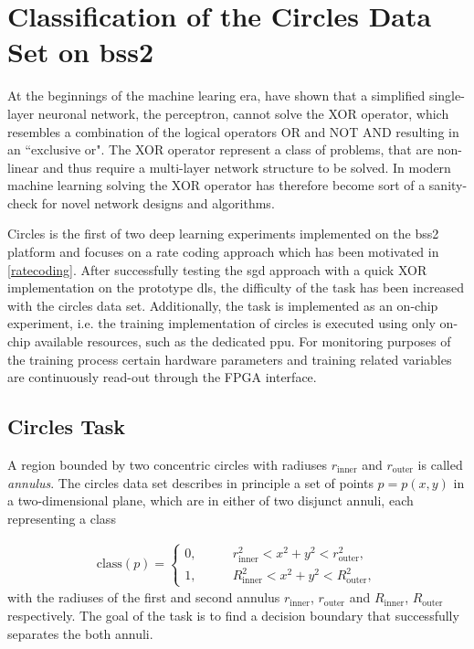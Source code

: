 \chapter{Classification of the Circles Data Set on \acrshort{bss2}}
\label{circles}
At the beginnings of the machine learing era, \cite{perceptron} have shown that a simplified single-layer neuronal network, the perceptron, cannot solve the XOR operator, which resembles a combination of the logical operators OR and NOT AND resulting in an ``exclusive or". The XOR operator represent a class of problems, that are non-linear and thus require a multi-layer network structure to be solved. In modern machine learning solving the XOR operator has therefore become sort of a sanity-check for novel network designs and algorithms.

Circles is the first of two deep learning experiments implemented on the \gls{bss2} platform and focuses on a rate coding approach which has been motivated in \cref{ratecoding}. After successfully testing the \acrlong{sgd} approach with a quick XOR implementation on the prototype \gls{dls}, the difficulty of the task has been increased with the circles data set. Additionally, the task is implemented as an on-chip experiment, i.e. the training implementation of circles is executed using only on-chip available resources, such as the dedicated \acrlong{ppu}. For monitoring purposes of the training process certain hardware parameters and training related variables are continuously read-out through the FPGA interface.





\section{Circles Task}
\label{circlestask}
A region bounded by two concentric circles with radiuses $r_{\text{inner}}$ and $r_{\text{outer}}$ is called \emph{annulus}. The circles data set describes in principle a set of points $p = p(x,y)$ in a two-dimensional plane, which are in either of two disjunct annuli, each representing a class 

\begin{align}
\text{class}(p) =
\begin{cases}
0 ,&\quad \quad r_{\text{inner}}^2 < x^2 + y^2 < r_{\text{outer}}^2, \\
1 ,&\quad \quad R_{\text{inner}}^2 < x^2 + y^2 < R_{\text{outer}}^2,
\end{cases}
\end{align}
with the radiuses of the first and second annulus $r_{\text{inner}}$, $r_{\text{outer}}$ and  $R_{\text{inner}}$, $R_{\text{outer}}$ respectively. The goal of the task is to find a decision boundary that successfully separates the both annuli.

